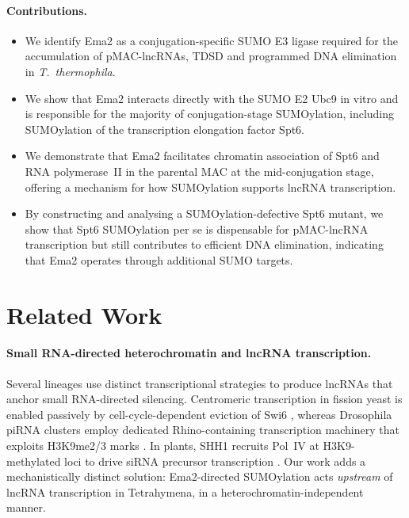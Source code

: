 \paragraph{Contributions.}
\begin{itemize}
  \item We identify Ema2 as a conjugation-specific SUMO E3 ligase required
        for the accumulation of pMAC-lncRNAs, TDSD and programmed DNA
        elimination in \emph{T.~thermophila}.
  \item We show that Ema2 interacts directly with the SUMO E2 Ubc9 in vitro
        and is responsible for the majority of conjugation-stage SUMOylation,
        including SUMOylation of the transcription elongation factor Spt6.
  \item We demonstrate that Ema2 facilitates chromatin association of Spt6
        and RNA polymerase~II in the parental MAC at the mid-conjugation
        stage, offering a mechanism for how SUMOylation supports lncRNA
        transcription.
  \item By constructing and analysing a SUMOylation-defective Spt6 mutant, we
        show that Spt6 SUMOylation per se is dispensable for pMAC-lncRNA
        transcription but still contributes to efficient DNA elimination,
        indicating that Ema2 operates through additional SUMO targets.
\end{itemize}

\section{Related Work}

\paragraph{Small RNA-directed heterochromatin and lncRNA transcription.}
Several lineages use distinct transcriptional strategies to produce lncRNAs
that anchor small RNA-directed silencing. Centromeric transcription in fission
yeast is enabled passively by cell-cycle-dependent eviction of Swi6
\citep{volpe2002rnai,hall2002heterochromatin}, whereas Drosophila piRNA
clusters employ dedicated Rhino-containing transcription machinery that
exploits H3K9me2/3 marks \citep{lethomas2014rhino,andersen2017heterochromatin}.
In plants, SHH1 recruits Pol~IV at H3K9-methylated loci to drive siRNA
precursor transcription \citep{law2013shh1}. Our work adds a mechanistically
distinct solution: Ema2-directed SUMOylation acts \emph{upstream} of lncRNA
transcription in Tetrahymena, in a heterochromatin-independent manner.

